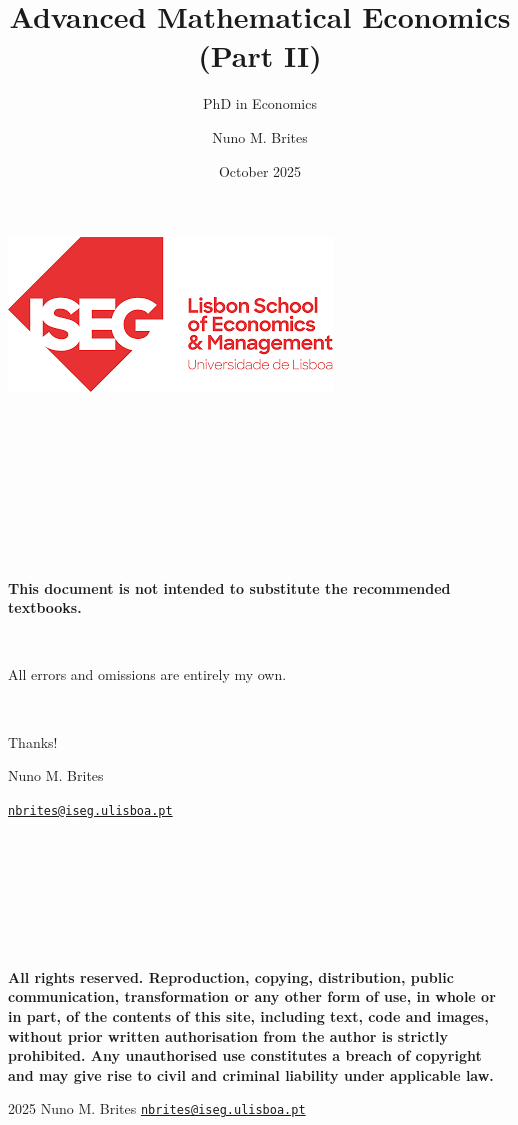 \documentclass[
  11pt,
  a4paper,
]{book}
\title{Advanced Mathematical Economics (Part II)}
\subtitle{PhD in Economics}
\author{Nuno M. Brites}
\date{October 2025}
\theoremstyle{definition}
\theoremstyle{definition}
\theoremstyle{definition}
\theoremstyle{definition}
\theoremstyle{remark}
\begin{document}
\maketitle

{
\hypersetup{linkcolor=}
\setcounter{tocdepth}{2}
\tableofcontents
}
\chapter*{}\label{section}

\begin{center}\includegraphics[width=0.4\linewidth]{figures/iseg} \end{center}

\(\,\)

\(\,\)

\(\,\)

\(\,\)

\(\,\)

\textbf{This document is not intended to substitute the recommended textbooks.}

\(\,\)

All errors and omissions are entirely my own.

\(\,\)

Thanks!

Nuno M. Brites

\href{mailto:nbrites@iseg.ulisboa.pt}{\nolinkurl{nbrites@iseg.ulisboa.pt}}

\vfill

\(\,\)

\(\,\)

\(\,\)

\(\,\)

\textbf{All rights reserved. Reproduction, copying, distribution, public communication, transformation or any other form of use, in whole or in part, of the contents of this site, including text, code and images, without prior written authorisation from the author is strictly prohibited. Any unauthorised use constitutes a breach of copyright and may give rise to civil and criminal liability under applicable law.}

2025 \textbar{} Nuno M. Brites \textbar{}
\href{mailto:nbrites@iseg.ulisboa.pt}{\nolinkurl{nbrites@iseg.ulisboa.pt}}
\end{document}
